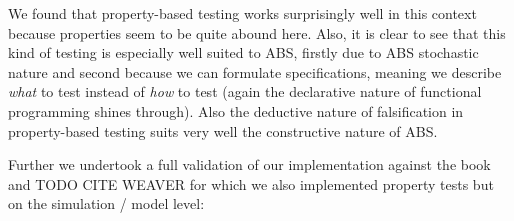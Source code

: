 We found that property-based testing works surprisingly well in this context because properties seem to be quite abound here. Also, it is clear to see that this kind of testing is especially well suited to ABS, firstly due to ABS stochastic nature and second because we can formulate specifications, meaning we describe \textit{what} to test instead of \textit{how} to test (again the declarative nature of functional programming shines through). Also the deductive nature of falsification in property-based testing suits very well the constructive nature of ABS.

Further we undertook a full validation of our implementation against the book and TODO CITE WEAVER for which we also implemented property tests but on the simulation / model level: 